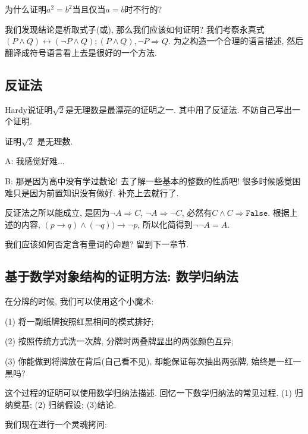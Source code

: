 \begin{prob}
	为什么证明$a^2=b^2$当且仅当$a=b$时不行的?
\end{prob}

我们发现结论是析取式子(或), 那么我们应该如何证明? 我们考察永真式$(P\land Q)\leftrightarrow(\lnot P \land Q); (P\land Q), \lnot P \Rightarrow Q$. 为之构造一个合理的语言描述, 然后翻译成符号语言看上去是很好的一个方法. 


\subsection*{反证法}

Hardy说证明$\sqrt 2$是无理数是最漂亮的证明之一. 其中用了反证法. 不妨自己写出一个证明. 

\begin{prob}
	证明$\sqrt{ 2}$ 是无理数. 
\end{prob}

\begin{dialogue}
	A: 我感觉好难...
	
	B: 那是因为高中没有学过数论! 去了解一些基本的整数的性质吧! 很多时候感觉困难只是因为前置知识没有做好. 补充上去就行了. 
\end{dialogue}
	

反证法之所以能成立, 是因为$\lnot A \Rightarrow C$, $\lnot A \Rightarrow \lnot C$, 必然有$C\land C \Rightarrow \texttt{False}$. 根据上述的内容, $(p\to q)\land (\lnot q))\to \lnot p$, 所以化简得到$\lnot \lnot A=A$. 

\begin{bonus}
	我们应该如何否定含有量词的命题? 留到下一章节.
\end{bonus}

\subsection*{基于数学对象结构的证明方法: 数学归纳法}

在分牌的时候, 我们可以使用这个小魔术: 

(1) 将一副纸牌按照红黑相间的模式排好;

(2) 按照传统方式洗一次牌, 分牌时两叠牌显出的两张颜色互异;

(3) 你能做到将牌放在背后(自己看不见), 却能保证每次抽出两张牌, 始终是一红一黑吗?

这个过程的证明可以使用数学归纳法描述. 回忆一下数学归纳法的常见过程. (1) 归纳奠基; (2) 归纳假设; (3)结论. 

我们现在进行一个灵魂拷问: 

